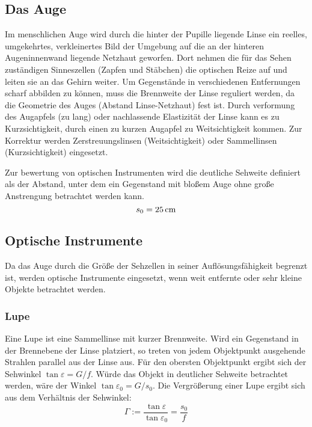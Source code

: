 \documentclass[a4paper]{scrartcl}
\begin{document}
\subsection{Das Auge}
Im menschlichen Auge wird durch die hinter der Pupille liegende Linse ein reelles, umgekehrtes, verkleinertes Bild der Umgebung auf die an der hinteren Augeninnenwand liegende Netzhaut geworfen. Dort nehmen die für das Sehen zuständigen Sinneszellen (Zapfen und Stäbchen) die optischen Reize auf und leiten sie an das Gehirn weiter. Um Gegenstände in verschiedenen Entfernungen scharf abbilden zu können, muss die Brennweite der Linse reguliert werden, da die Geometrie des Auges (Abstand Linse-Netzhaut) fest ist. Durch verformung des Augapfels (zu lang) oder nachlassende Elastizität der Linse kann es zu Kurzsichtigkeit, durch einen zu kurzen Augapfel zu Weitsichtigkeit kommen. Zur Korrektur werden Zerstreuungslinsen (Weitsichtigkeit) oder Sammellinsen (Kurzsichtigkeit) eingesetzt.

Zur bewertung von optischen Instrumenten wird die deutliche Sehweite definiert als der Abstand, unter dem ein Gegenstand mit bloßem Auge ohne große Anstrengung betrachtet werden kann.
\begin{equation*}
  s_0 = \unit[25]{cm}
\end{equation*}

\subsection{Optische Instrumente}
Da das Auge durch die Größe der Sehzellen in seiner Auflösungsfähigkeit begrenzt ist, werden optische Instrumente eingesetzt, wenn weit entfernte oder sehr kleine Objekte betrachtet werden.

\subsubsection{Lupe}
Eine Lupe ist eine Sammellinse mit kurzer Brennweite. Wird ein Gegenstand in der Brennebene der Linse platziert, so treten von jedem Objektpunkt ausgehende Strahlen parallel aus der Linse aus. Für den obersten Objektpunkt ergibt sich der Sehwinkel $\tan  \varepsilon = G/f$. Würde das Objekt in deutlicher Sehweite betrachtet werden, wäre der Winkel $\tan \varepsilon_0 = G/s_0$. Die Vergrößerung einer Lupe ergibt sich aus dem Verhältnis der Sehwinkel:
\begin{equation*}
  \Gamma := \frac{\tan \varepsilon}{\tan \varepsilon_0} = \frac{s_0}{f}
\end{equation*}
\end{document}
